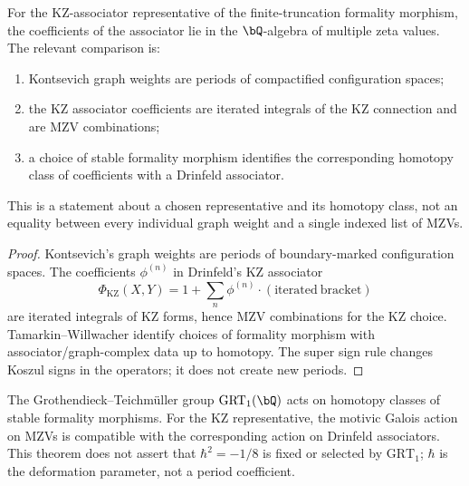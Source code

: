 \begin{theorem}
\label{thm:defq-unified-motivic-origin}
For the KZ-associator representative of the finite-truncation
formality morphism, the coefficients of the associator lie in the
\(\bQ\)-algebra of multiple zeta values. The relevant comparison is:
\begin{enumerate}[label=\textup{(\roman*)}]
 \item Kontsevich graph weights are periods of compactified
 configuration spaces;
 \item the KZ associator coefficients are iterated integrals of the
 KZ connection and are MZV combinations;
 \item a choice of stable formality morphism identifies the
 corresponding homotopy class of coefficients with a Drinfeld
 associator.
\end{enumerate}
This is a statement about a chosen representative and its homotopy
class, not an equality between every individual graph weight and a
single indexed list of MZVs.
\end{theorem}

\begin{proof}
Kontsevich's graph weights are periods of boundary-marked
configuration spaces. The coefficients \(\phi^{(n)}\) in Drinfeld's
KZ associator
\[
\Phi_{\mathrm{KZ}}(X,Y)
=1+\sum_n\phi^{(n)}\cdot(\mathrm{iterated~bracket})
\]
are iterated integrals of KZ forms, hence MZV combinations for the
KZ choice. Tamarkin--Willwacher
identify choices of formality morphism with associator/graph-complex
data up to homotopy. The super sign rule changes Koszul signs in the
operators; it does not create new periods.
\end{proof}

\begin{theorem}
\label{thm:defq-grt1-equivariance}
The Grothendieck--Teichm\"uller group $\mathrm{GRT}_1(\bQ)$ acts on
homotopy classes of stable formality morphisms. For the KZ
representative, the motivic Galois action on MZVs is compatible with
the corresponding action on Drinfeld associators. This theorem does
not assert that \(\hbar^2=-1/8\) is fixed or selected by
\(\mathrm{GRT}_1\); \(\hbar\) is the deformation parameter, not a
period coefficient.
\end{theorem}

